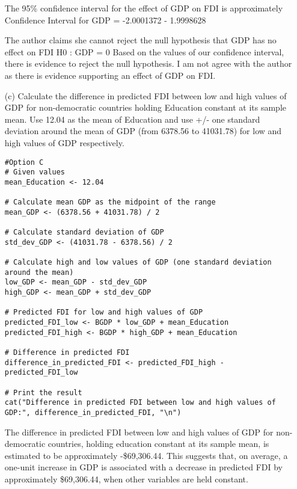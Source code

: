 \documentclass[12pt,letterpaper]{article}
\begin{document}
\begin{enumerate}
	The 95\% confidence interval for the effect of GDP on FDI is approximately
	Confidence Interval for GDP = -2.0001372 - 1.9998628

	The author claims she cannot reject the null hypothesis that GDP has no effect on FDI H0 : GDP = 0
	Based on the values of our confidence interval, there is evidence to reject the null hypothesis. I am not agree with the author as there is evidence supporting an effect of GDP on FDI. 



\newpage
	\item [(c)] Calculate the difference in predicted FDI between low and high values of GDP for
	non-democratic countries holding Education constant at its sample mean. Use 12.04 as the mean of Education and use +/- one standard deviation around the mean of GDP (from 6378.56 to 41031.78) for low and high values of GDP respectively.
	\vspace{.25cm}

	\begin{lstlisting}
#Option C
# Given values
mean_Education <- 12.04

# Calculate mean GDP as the midpoint of the range
mean_GDP <- (6378.56 + 41031.78) / 2

# Calculate standard deviation of GDP
std_dev_GDP <- (41031.78 - 6378.56) / 2

# Calculate high and low values of GDP (one standard deviation around the mean)
low_GDP <- mean_GDP - std_dev_GDP
high_GDP <- mean_GDP + std_dev_GDP

# Predicted FDI for low and high values of GDP
predicted_FDI_low <- BGDP * low_GDP + mean_Education
predicted_FDI_high <- BGDP * high_GDP + mean_Education

# Difference in predicted FDI
difference_in_predicted_FDI <- predicted_FDI_high - predicted_FDI_low

# Print the result
cat("Difference in predicted FDI between low and high values of GDP:", difference_in_predicted_FDI, "\n")

	\end{lstlisting}

The difference in predicted FDI between low and high values of GDP for non-democratic countries, holding education constant at its sample mean, is estimated to be approximately -\$69,306.44. This suggests that, on average, a one-unit increase in GDP is associated with a decrease in predicted FDI by approximately \$69,306.44, when other variables are held constant.

\end{enumerate}
\end{document}
